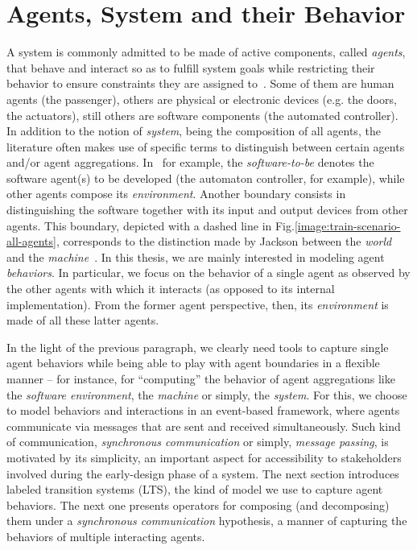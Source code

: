 \section{Agents, System and their Behavior}

A system is commonly admitted to be made of active components, called \emph{agents}, that behave and interact so as to fulfill system goals while restricting their behavior to ensure constraints they are assigned to~\cite{Feather:1987}. Some of them are human agents (the passenger), others are physical or electronic devices (e.g. the doors, the actuators), still others are software components (the automated controller). In addition to the notion of \emph{system}, being the composition of all agents, the literature often makes use of specific terms to distinguish between certain agents and/or agent aggregations. In~\cite{VanLamsweerde:2009} for example, the \emph{software-to-be} denotes the software agent(s) to be developed (the automaton controller, for example), while other agents compose its \emph{environment}. Another boundary consists in distinguishing the software together with its input and output devices from other agents. This boundary, depicted with a dashed line in Fig.\ref{image:train-scenario-all-agents}, corresponds to the distinction made by Jackson between the \emph{world} and the \emph{machine}~\cite{Jackson:1995}. In this thesis, we are mainly interested in modeling agent \emph{behaviors}. In particular, we focus on the behavior of a single agent as observed by the other agents with which it interacts (as opposed to its internal implementation). From the former agent perspective, then, its \emph{environment} is made of all these latter agents. 

In the light of the previous paragraph, we clearly need tools to capture single agent behaviors while being able to play with agent boundaries in a flexible manner -- for instance, for ``computing'' the behavior of agent aggregations like the \emph{software environment}, the \emph{machine} or simply, the \emph{system}. For this, we choose to model behaviors and interactions in an event-based framework, where agents communicate via messages that are sent and received simultaneously. Such kind of communication, \emph{synchronous communication} or simply, \emph{message passing}, is motivated by its simplicity, an important aspect for accessibility to stakeholders involved during the early-design phase of a system. The next section introduces  labeled transition systems (LTS), the kind of model we use to capture agent behaviors. The next one presents operators for composing (and decomposing) them under a \emph{synchronous communication} hypothesis, a manner of capturing the behaviors of multiple interacting agents.

